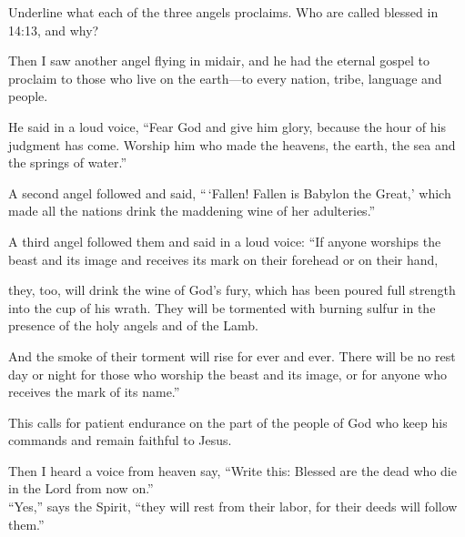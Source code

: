 \begin{ScriptureBox2}{Underline what each of the three angels proclaims. Who are called blessed in 14:13, and why?}

\item[14:6] Then I saw another angel flying in midair, and he had the eternal gospel to proclaim to those who live on the earth---to every nation, tribe, language and people.

\item[14:7] He said in a loud voice, ``Fear God and give him glory, because the hour of his judgment has come. Worship him who made the heavens, the earth, the sea and the springs of water.''

\item[14:8] A second angel followed and said, ``\,`Fallen! Fallen is Babylon the Great,' which made all the nations drink the maddening wine of her adulteries.''

\item[14:9] A third angel followed them and said in a loud voice: ``If anyone worships the beast and its image and receives its mark on their forehead or on their hand,

\item[14:10] they, too, will drink the wine of God's fury, which has been poured full strength into the cup of his wrath. They will be tormented with burning sulfur in the presence of the holy angels and of the Lamb.

\item[14:11] And the smoke of their torment will rise for ever and ever. There will be no rest day or night for those who worship the beast and its image, or for anyone who receives the mark of its name.''

\item[14:12] This calls for patient endurance on the part of the people of God who keep his commands and remain faithful to Jesus.

\item[14:13] Then I heard a voice from heaven say, ``Write this: Blessed are the dead who die in the Lord from now on.''\\
``Yes,'' says the Spirit, ``they will rest from their labor, for their deeds will follow them.''

\end{ScriptureBox2}

